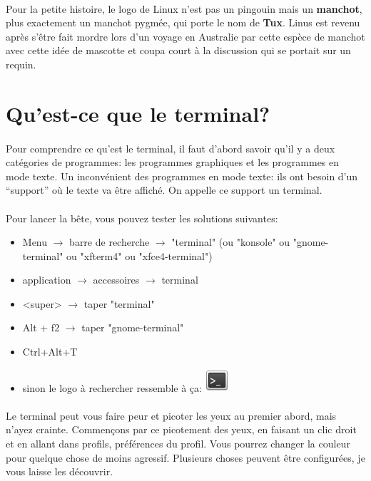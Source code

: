 \documentclass[french, a4paper, 12pt, titlepage]{article}
\begin{document}
\paragraph{}
Pour la petite histoire, le logo de Linux n'est pas un pingouin mais un
\textbf{manchot}, plus exactement un manchot pygmée, qui porte le nom de
\textbf{Tux}. Linus est revenu après s'être fait mordre lors d'un voyage en
Australie par cette espèce de manchot avec cette idée de mascotte et coupa
court à la discussion qui se portait sur un requin.

\newpage
\section{Qu'est-ce que le terminal?}

\paragraph{} Pour comprendre ce qu'est le terminal, il faut d'abord savoir
qu'il y a deux catégories de programmes: les programmes graphiques et les
programmes en mode texte. Un inconvénient des programmes en mode texte: ils ont
besoin d'un ``support'' où le texte va être affiché. On appelle ce support un
terminal.

\paragraph{} Pour lancer la bête, vous pouvez tester les solutions suivantes:
\begin{itemize}
	\item Menu $\rightarrow$ barre de recherche $\rightarrow$ "terminal" (ou
		"konsole" ou "gnome-terminal" ou "xfterm4" ou "xfce4-terminal")
	\item application $\rightarrow$ accessoires $\rightarrow$ terminal
	\item <super> $\rightarrow$ taper "terminal"
	\item Alt + f2 $\rightarrow$ taper "gnome-terminal"
	\item Ctrl+Alt+T
	\item sinon le logo à rechercher ressemble à ça:
		\includegraphics[scale=0.7]{Images/termIcon}
\end{itemize}

\paragraph{} Le terminal peut vous faire peur et picoter les yeux au premier
abord, mais n'ayez crainte. Commençons par ce picotement des yeux, en faisant
un clic droit et en allant dans profils, préférences du profil. Vous pourrez
changer la couleur pour quelque chose de moins agressif. Plusieurs choses
peuvent être configurées, je vous laisse les découvrir.
\end{document}
